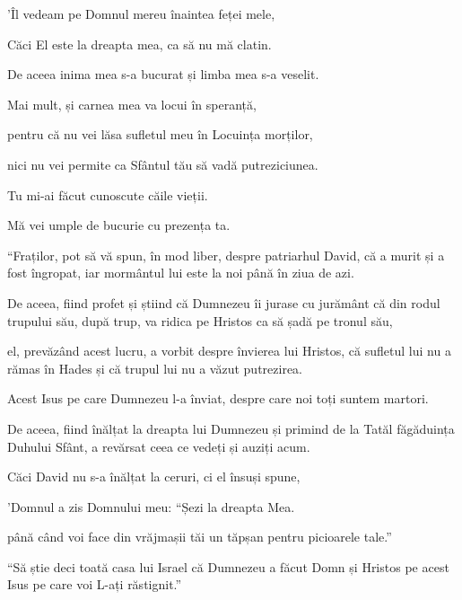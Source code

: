 {\par }{\Q 'Îl vedeam pe Domnul mereu înaintea feței mele,

\par }{\QB Căci El este la dreapta mea, ca să nu mă clatin.


\par }{\Q {}De aceea inima mea s-a bucurat și limba mea s-a veselit.

\par }{\QB Mai mult, și carnea mea va locui în speranță,


\par }{\Q {}pentru că nu vei lăsa sufletul meu în Locuința morților,

\par }{\QB nici nu vei permite ca Sfântul tău să vadă putreziciunea.


\par }{\Q {}Tu mi-ai făcut cunoscute căile vieții.

\par }{\QB Mă vei umple de bucurie cu prezența ta.


\par }{\PP {}“Fraților, pot să vă spun, în mod liber, despre patriarhul David, că a murit și a fost îngropat, iar mormântul lui este la noi până în ziua de azi.

De aceea, fiind profet și știind că Dumnezeu îi jurase cu jurământ că din rodul trupului său, după trup, va ridica pe Hristos ca să șadă pe tronul său,

el, prevăzând acest lucru, a vorbit despre învierea lui Hristos, că sufletul lui nu a rămas în Hades și că trupul lui nu a văzut putrezirea.

Acest Isus pe care Dumnezeu l-a înviat, despre care noi toți suntem martori.

De aceea, fiind înălțat la dreapta lui Dumnezeu și primind de la Tatăl făgăduința Duhului Sfânt, a revărsat ceea ce vedeți și auziți acum.

Căci David nu s-a înălțat la ceruri, ci el însuși spune,

\par }{\Q 'Domnul a zis Domnului meu: “Șezi la dreapta Mea.


\par }{\QB {}până când voi face din vrăjmașii tăi un tăpșan pentru picioarele tale.”


\par }{\PP {}“Să știe deci toată casa lui Israel că Dumnezeu a făcut Domn și Hristos pe acest Isus pe care voi L-ați răstignit.”


}
